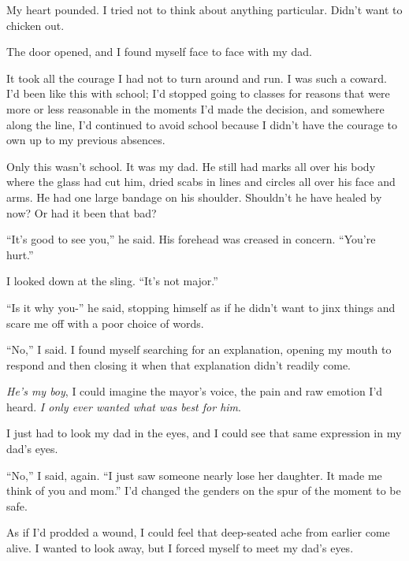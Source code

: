 My heart pounded.  I tried not to think about anything particular.  Didn't want to chicken out.



The door opened, and I found myself face to face with my dad.



It took all the courage I had not to turn around and run.  I was such a coward.  I'd been like this with school; I'd stopped going to classes for reasons that were more or less reasonable in the moments I'd made the decision, and somewhere along the line, I'd continued to avoid school because I didn't have the courage to own up to my previous absences.



Only this wasn't school.  It was my dad.  He still had marks all over his body where the glass had cut him, dried scabs in lines and circles all over his face and arms.  He had one large bandage on his shoulder.  Shouldn't he have healed by now?  Or had it been that bad?



``It's good to see you,'' he said.  His forehead was creased in concern.  ``You're hurt.''



I looked down at the sling.  ``It's not major.''



``Is it why you-'' he said, stopping himself as if he didn't want to jinx things and scare me off with a poor choice of words.



``No,'' I said.  I found myself searching for an explanation, opening my mouth to respond and then closing it when that explanation didn't readily come.



\emph{He's my boy}, I could imagine the mayor's voice, the pain and raw emotion I'd heard.  \emph{I only ever wanted what was best for him}.



I just had to look my dad in the eyes, and I could see that same expression in my dad's eyes.



``No,'' I said, again.  ``I just saw someone nearly lose her daughter.  It made me think of you and mom.''  I'd changed the genders on the spur of the moment to be safe.



As if I'd prodded a wound, I could feel that deep-seated ache from earlier come alive.  I wanted to look away, but I forced myself to meet my dad's eyes.



